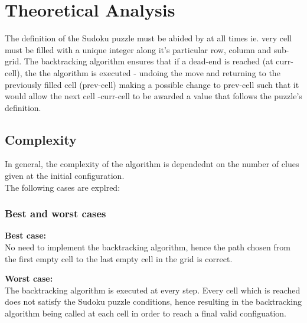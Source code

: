 \documentclass[12pt]{article}
\begin{document}
\section{Theoretical Analysis}
\begin{flushleft}
The definition of the Sudoku puzzle must be abided by at all times ie. very cell must be filled with a unique integer along it's particular row, column and sub-grid.  The backtracking algorithm ensures that if a dead-end is reached (at curr-cell), the the algorithm is executed - undoing the move and returning to the previously filled cell (prev-cell) making a possible change to prev-cell such that it would allow the next cell -curr-cell to be awarded a value that follows the puzzle's definition. 
\end{flushleft}
\subsection{Complexity}
\begin{flushleft}
In general, the complexity of the algorithm is dependednt on the number of clues given at the initial configuration. \\
The following cases are explred:
\end{flushleft}

\subsubsection{Best and worst cases}
\begin{flushleft}
\textbf{Best case:}\\
No need to implement the backtracking algorithm, hence the path chosen from the first empty cell to the last empty cell in the grid is correct. 
\end{flushleft}
\begin{flushleft}
\textbf{Worst case:}\\
The backtracking algorithm is executed at every step. Every cell which is reached does not satisfy the Sudoku puzzle conditions, hence resulting in the backtracking algorithm being called at each cell in order to reach a final valid configuation.  
\end{flushleft}
\end{document}

